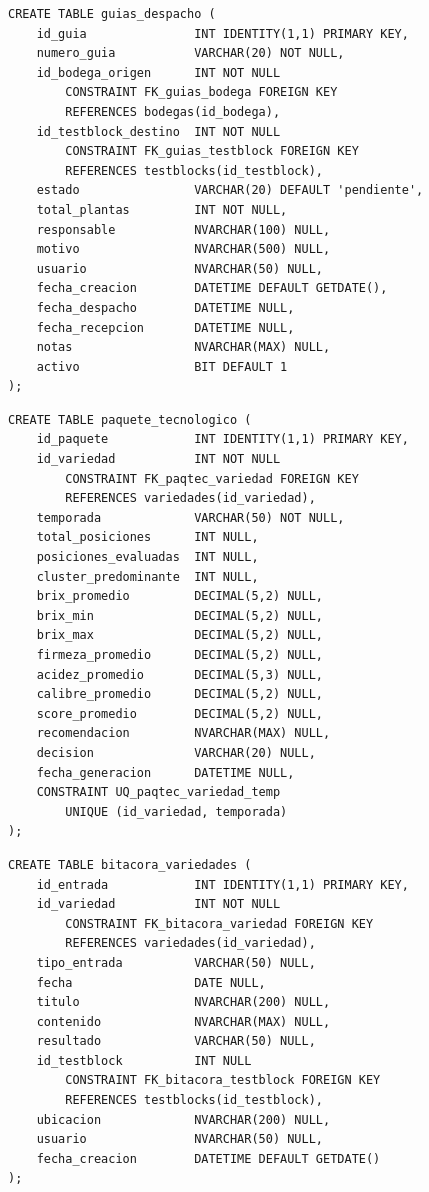 \documentclass[12pt,a4paper,twoside]{report}
\begin{document}
\begin{lstlisting}[style=sqlstyle, caption={guias\_despacho}]
CREATE TABLE guias_despacho (
    id_guia               INT IDENTITY(1,1) PRIMARY KEY,
    numero_guia           VARCHAR(20) NOT NULL,
    id_bodega_origen      INT NOT NULL
        CONSTRAINT FK_guias_bodega FOREIGN KEY
        REFERENCES bodegas(id_bodega),
    id_testblock_destino  INT NOT NULL
        CONSTRAINT FK_guias_testblock FOREIGN KEY
        REFERENCES testblocks(id_testblock),
    estado                VARCHAR(20) DEFAULT 'pendiente',
    total_plantas         INT NOT NULL,
    responsable           NVARCHAR(100) NULL,
    motivo                NVARCHAR(500) NULL,
    usuario               NVARCHAR(50) NULL,
    fecha_creacion        DATETIME DEFAULT GETDATE(),
    fecha_despacho        DATETIME NULL,
    fecha_recepcion       DATETIME NULL,
    notas                 NVARCHAR(MAX) NULL,
    activo                BIT DEFAULT 1
);
\end{lstlisting}

\begin{lstlisting}[style=sqlstyle, caption={paquete\_tecnologico}]
CREATE TABLE paquete_tecnologico (
    id_paquete            INT IDENTITY(1,1) PRIMARY KEY,
    id_variedad           INT NOT NULL
        CONSTRAINT FK_paqtec_variedad FOREIGN KEY
        REFERENCES variedades(id_variedad),
    temporada             VARCHAR(50) NOT NULL,
    total_posiciones      INT NULL,
    posiciones_evaluadas  INT NULL,
    cluster_predominante  INT NULL,
    brix_promedio         DECIMAL(5,2) NULL,
    brix_min              DECIMAL(5,2) NULL,
    brix_max              DECIMAL(5,2) NULL,
    firmeza_promedio      DECIMAL(5,2) NULL,
    acidez_promedio       DECIMAL(5,3) NULL,
    calibre_promedio      DECIMAL(5,2) NULL,
    score_promedio        DECIMAL(5,2) NULL,
    recomendacion         NVARCHAR(MAX) NULL,
    decision              VARCHAR(20) NULL,
    fecha_generacion      DATETIME NULL,
    CONSTRAINT UQ_paqtec_variedad_temp
        UNIQUE (id_variedad, temporada)
);
\end{lstlisting}

\begin{lstlisting}[style=sqlstyle, caption={bitacora\_variedades}]
CREATE TABLE bitacora_variedades (
    id_entrada            INT IDENTITY(1,1) PRIMARY KEY,
    id_variedad           INT NOT NULL
        CONSTRAINT FK_bitacora_variedad FOREIGN KEY
        REFERENCES variedades(id_variedad),
    tipo_entrada          VARCHAR(50) NULL,
    fecha                 DATE NULL,
    titulo                NVARCHAR(200) NULL,
    contenido             NVARCHAR(MAX) NULL,
    resultado             VARCHAR(50) NULL,
    id_testblock          INT NULL
        CONSTRAINT FK_bitacora_testblock FOREIGN KEY
        REFERENCES testblocks(id_testblock),
    ubicacion             NVARCHAR(200) NULL,
    usuario               NVARCHAR(50) NULL,
    fecha_creacion        DATETIME DEFAULT GETDATE()
);
\end{lstlisting}
\end{document}
